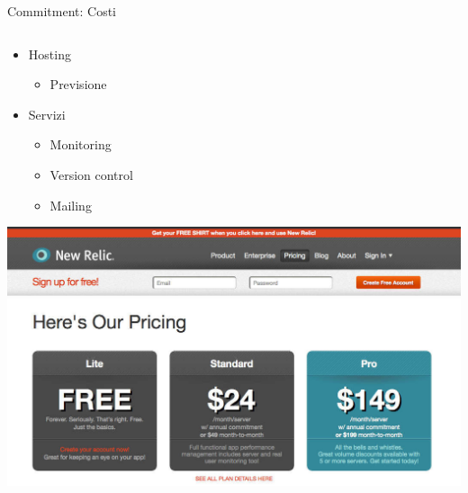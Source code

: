 	\begin{frame}{Commitment: Costi}
		
		\begin{columns}[T]
		    \begin{column}{.5\textwidth}
			
				\begin{itemize}
					\item Hosting
						\begin{itemize}
							\item Previsione
						\end{itemize}
					\item Servizi
					\begin{itemize}
						\item Monitoring
						\item Version control
						\item Mailing
					\end{itemize}
				\end{itemize}
				
				\vspace*{0.2cm}
				\hspace*{0.5cm} \includegraphics[scale=0.14]{images/costs-3}
    		\end{column}


\end{columns}
\end{frame}
